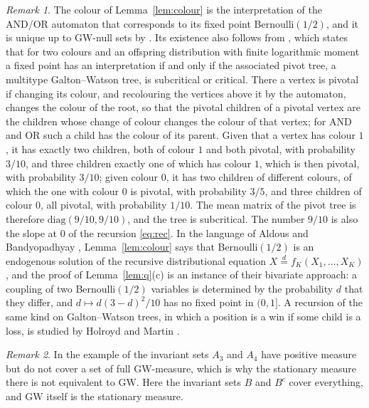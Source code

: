 \documentclass[11pt]{amsart}
\theoremstyle{remark}
\newtheorem{remark}{Remark}
\numberwithin{equation}{section}
\newcommand{\GW}{\mathrm{GW}}
\begin{document}
\begin{remark}\label{rem:jps}
The colour of Lemma~\ref{lem:colour} is the interpretation of the AND/OR automaton that corresponds to its fixed point Bernoulli$(1/2)$, and it is unique up to $\GW$-null sets by \cite[Proposition~1.6]{JPS}. Its existence also follows from \cite[Theorem~1.7]{JPS}, which states that for two colours and an offspring distribution with finite logarithmic moment a fixed point has an interpretation if and only if the associated pivot tree, a multitype Galton--Watson tree, is subcritical or critical. There a vertex is pivotal if changing its colour, and recolouring the vertices above it by the automaton, changes the colour of the root, so that the pivotal children of a pivotal vertex are the children whose change of colour changes the colour of that vertex; for AND and OR such a child has the colour of its parent. Given that a vertex has colour $1$, it has exactly two children, both of colour $1$ and both pivotal, with probability $3/10$, and three children exactly one of which has colour $1$, which is then pivotal, with probability $3/10$; given colour $0$, it has two children of different colours, of which the one with colour $0$ is pivotal, with probability $3/5$, and three children of colour $0$, all pivotal, with probability $1/10$. The mean matrix of the pivot tree is therefore $\mathrm{diag}(9/10,9/10)$, and the tree is subcritical. The number $9/10$ is also the slope at $0$ of the recursion \eqref{eq:rec}. In the language of Aldous and Bandyopadhyay \cite{AB}, Lemma~\ref{lem:colour} says that Bernoulli$(1/2)$ is an endogenous solution of the recursive distributional equation $X\overset{d}{=}f_K(X_1,\dots,X_K)$, and the proof of Lemma~\ref{lem:q}(c) is an instance of their bivariate approach: a coupling of two Bernoulli$(1/2)$ variables is determined by the probability $d$ that they differ, and $d\mapsto d(3-d)^2/10$ has no fixed point in $(0,1]$. A recursion of the same kind on Galton--Watson trees, in which a position is a win if some child is a loss, is studied by Holroyd and Martin \cite{HM21}.
\end{remark}

\begin{remark}
In the example of \cite[Exercise~17.22]{LP} the invariant sets $A_3$ and $A_4$ have positive measure but do not cover a set of full $\GW$-measure, which is why the stationary measure there is not equivalent to $\GW$. Here the invariant sets $B$ and $B^c$ cover everything, and $\GW$ itself is the stationary measure.
\end{remark}
\end{document}
